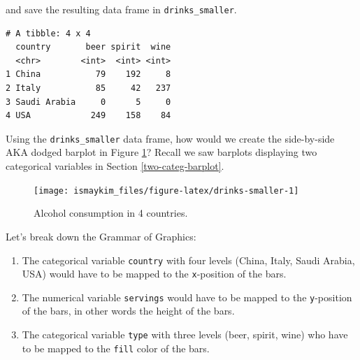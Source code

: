 \documentclass[12pt, krantz2,]{krantz}
\makeatletter
\newenvironment{Shaded}{\begin{snugshade}}{\end{snugshade}}
\newcommand{\DataTypeTok}[1]{\textcolor[rgb]{0.27,0.27,0.27}{#1}}
\newcommand{\KeywordTok}[1]{\textcolor[rgb]{0.27,0.27,0.27}{\textbf{#1}}}
\newcommand{\NormalTok}[1]{#1}
\newcommand{\OperatorTok}[1]{\textcolor[rgb]{0.43,0.43,0.43}{\textbf{#1}}}
\newcommand{\StringTok}[1]{\textcolor[rgb]{0.5,0.5,0.5}{#1}}
\providecommand{\tightlist}{%
  \setlength{\itemsep}{0pt}\setlength{\parskip}{0pt}}
\newenvironment{kframe}{%
\medskip{}
\setlength{\fboxsep}{.8em}
 \def\at@end@of@kframe{}%
 \ifinner\ifhmode%
  \def\at@end@of@kframe{\end{minipage}}%
  \begin{minipage}{\columnwidth}%
 \fi\fi%
 \def\FrameCommand##1{\hskip\@totalleftmargin \hskip-\fboxsep
 \colorbox{shadecolor}{##1}\hskip-\fboxsep
     \hskip-\linewidth \hskip-\@totalleftmargin \hskip\columnwidth}%
 \MakeFramed {\advance\hsize-\width
   \@totalleftmargin\z@ \linewidth\hsize
   \@setminipage}}%
 {\par\unskip\endMakeFramed%
 \at@end@of@kframe}
\renewenvironment{Shaded}{\begin{kframe}}{\end{kframe}}
\makeatother
\begin{document}
and save the resulting data frame in \texttt{drinks\_smaller}.

\begin{Shaded}
\end{Shaded}

\begin{verbatim}
# A tibble: 4 x 4
  country       beer spirit  wine
  <chr>        <int>  <int> <int>
1 China           79    192     8
2 Italy           85     42   237
3 Saudi Arabia     0      5     0
4 USA            249    158    84
\end{verbatim}

Using the \texttt{drinks\_smaller} data frame, how would we create the side-by-side AKA dodged barplot in Figure \ref{fig:drinks-smaller}? Recall we saw barplots displaying two categorical variables in Section \ref{two-categ-barplot}.

\begin{figure}

{\centering \texttt{[image: ismaykim\_files/figure-latex/drinks-smaller-1]} 

}

\caption{Alcohol consumption in 4 countries.}\label{fig:drinks-smaller}
\end{figure}

Let's break down the Grammar of Graphics:

\begin{enumerate}
\def\labelenumi{\arabic{enumi}.}
\tightlist
\item
  The categorical variable \texttt{country} with four levels (China, Italy, Saudi Arabia, USA) would have to be mapped to the \texttt{x}-position of the bars.
\item
  The numerical variable \texttt{servings} would have to be mapped to the \texttt{y}-position of the bars, in other words the height of the bars.
\item
  The categorical variable \texttt{type} with three levels (beer, spirit, wine) who have to be mapped to the \texttt{fill} color of the bars.
\end{enumerate}
\end{document}
